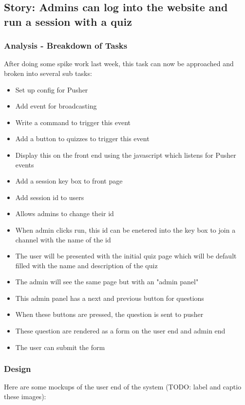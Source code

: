 \subsection{Story: Admins can log into the website and run a session with a quiz}
\subsubsection{Analysis - Breakdown of Tasks}
After doing some spike work last week, this task can now be approached and broken into several sub tasks:
\begin{itemize}
	\item Set up config for Pusher
	\item Add event for broadcasting
	\item Write a command to trigger this event
	\item Add a button to quizzes to trigger this event
	\item Display this on the front end using the javascript which listens for Pusher events
	\item Add a session key box to front page
	\item Add session id to users
	\item Allows admins to change their id
	\item When admin clicks run, this id can be enetered into the key box to join a channel with the name of the id
	\item The user will be presented with the initial quiz page which will be default filled with the name and description of the quiz
	\item The admin will see the same page but with an "admin panel"
	\item This admin panel has a next and previous button for questions
	\item When these buttons are pressed, the question is sent to pusher
	\item These question are rendered as a form on the user end and admin end
	\item The user can submit the form
\end{itemize}
\subsubsection{Design}
Here are some mockups of the user end of the system (TODO: label and captio these images): 

